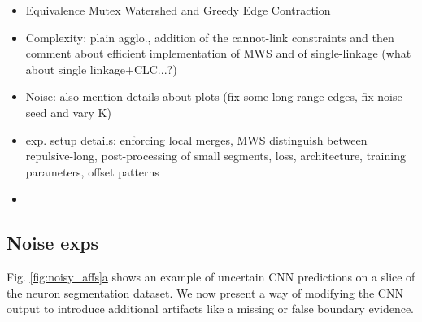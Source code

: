 \begin{itemize}
\item Equivalence Mutex Watershed and Greedy Edge Contraction
\item Complexity: plain agglo., addition of the cannot-link constraints and then comment about efficient implementation of MWS and of single-linkage (what about single linkage+CLC...?)
\item Noise: also mention details about plots (fix some long-range edges, fix noise seed and vary K)
\item exp. setup details: enforcing local merges, MWS distinguish between repulsive-long, post-processing of small segments, loss, architecture, training parameters, offset patterns
\item 

\end{itemize}

\subsection{Noise exps}
Fig. \hyperref[fig:noisy_affs]{\ref*{fig:noisy_affs}a} shows an example of uncertain CNN predictions on a slice of the neuron segmentation dataset. We now present a way of modifying the CNN output to introduce additional artifacts like a missing or false boundary evidence. 

